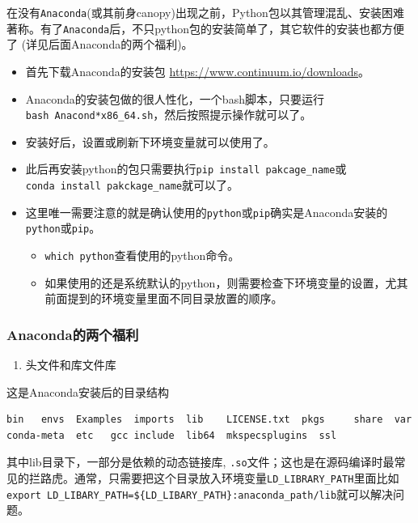 \documentclass[]{article}
\providecommand{\tightlist}{%
  \setlength{\itemsep}{0pt}\setlength{\parskip}{0pt}}
\numberwithin{figure}{section}
\numberwithin{table}{section}
\begin{document}
在没有\texttt{Anaconda}(或其前身canopy)出现之前，Python包以其管理混乱、安装困难著称。有了\texttt{Anaconda}后，不只python包的安装简单了，其它软件的安装也都方便了 (详见后面Anaconda的两个福利)。

\begin{itemize}
\tightlist
\item
  首先下载Anaconda的安装包 \url{https://www.continuum.io/downloads}。
\item
  Anaconda的安装包做的很人性化，一个bash脚本，只要运行\texttt{bash\ Anacond*x86\_64.sh}，然后按照提示操作就可以了。
\item
  安装好后，设置或刷新下环境变量就可以使用了。
\item
  此后再安装python的包只需要执行\texttt{pip\ install\ pakcage\_name}或\texttt{conda\ install\ pakckage\_name}就可以了。
\item
  这里唯一需要注意的就是确认使用的\texttt{python}或\texttt{pip}确实是Anaconda安装的\texttt{python}或\texttt{pip}。

  \begin{itemize}
  \tightlist
  \item
    \texttt{which\ python}查看使用的python命令。
  \item
    如果使用的还是系统默认的python，则需要检查下环境变量的设置，尤其前面提到的环境变量里面不同目录放置的顺序。
  \end{itemize}
\end{itemize}

\hypertarget{anaconda_fear}{%
\subsubsection{Anaconda的两个福利}\label{anaconda_fear}}

\begin{enumerate}
\def\labelenumi{\arabic{enumi}.}
\tightlist
\item
  头文件和库文件库
\end{enumerate}

这是Anaconda安装后的目录结构

\begin{verbatim}
bin   envs  Examples  imports  lib    LICENSE.txt  pkgs     share  var
conda-meta  etc   gcc include  lib64  mkspecsplugins  ssl
\end{verbatim}

其中lib目录下，一部分是依赖的动态链接库, \texttt{.so}文件；这也是在源码编译时最常见的拦路虎。通常，只需要把这个目录放入环境变量\texttt{LD\_LIBRARY\_PATH}里面比如\texttt{export\ LD\_LIBARY\_PATH=\$\{LD\_LIBARY\_PATH\}:anaconda\_path/lib}就可以解决问题。
\end{document}
